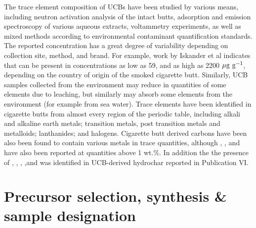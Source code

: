 The trace element composition of UCBs have been studied by various means, including neutron activation analysis of the intact butts,\citep{iskander1992multielement, Iskander1985, jenkins1985neutron, Wu1997} adsorption and emission spectroscopy of various aqueous extracts,\citep{MussaloRauhamaa1986, Kazi2009, Moriwaki2009, Moerman2011, Pelit2013, Dobaradaran2018} voltammetry experiments,\citep{Nitsch1991, Kalcher1993} as well as mixed methods according to environmental contaminant quantification standards.\citep{cardoso2018exposure} The reported concentration has a great degree of variability depending on collection site, method, and brand. For example, work by Iskander et al indicates that  can be present in concentrations as low as 59, and as high as 2200 $\rm{\mu g\ g^{-1}}$, depending on the country of origin of the smoked cigarette butt. Similarly, UCB samples collected from the environment\citep{Dobaradaran2017, Moriwaki2009, Moerman2011, chevalier2018nano} may reduce in quantities of some elements due to leaching, but similarly may absorb some elements from the environment (for example from sea water). Trace elements have been identified in cigarette butts from almost every region of the periodic table, including alkali and alkaline earth metals;\cite{MussaloRauhamaa1986, Iskander1985, iskander1992multielement, jenkins1985neutron, Wu1997, cardoso2018exposure}  transition metals, post transition metals and metalloids;\citep{MussaloRauhamaa1986, Dobaradaran2017, Iskander1985, jenkins1985neutron, Wu1997, Moriwaki2009, Moerman2011, Pelit2013, Dobaradaran2018, Ren2017, cardoso2018exposure, chevalier2018nano} lanthanides;\citep{iskander1992multielement} and halogens.\citep{Iskander1985, iskander1992multielement, jenkins1985neutron, Wu1997} Cigarette butt derived carbons have been also been found to contain various metals in trace quantities,\citep{Soltani, Soltani2013, Yazdi2012} although , , and  have also been reported at quantities above 1 wt.\%.\citep{Soltani, Soltani2013, Yazdi2012, Lima2018} In addition the the presence of , , , ,and  was identified in UCB-derived hydrochar reported in Publication VI.

\section{Precursor selection, synthesis \& sample designation}

